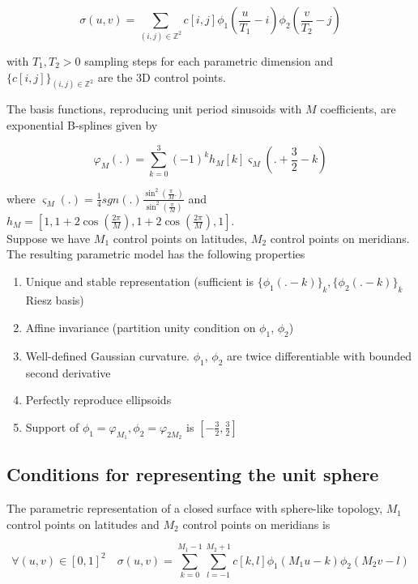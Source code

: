 \documentclass[a4paper, 11pt]{article}
\begin{document}
\begin{equation}
  \sigma(u, v) = \sum_{(i,j) \in \mathbb{Z}^2} c[i,j] \phi_1(\frac{u}{T_1}-i) \phi_2(\frac{v}{T_2}-j)
\end{equation}

with $T_1, T_2 > 0$ sampling steps for each parametric dimension and ${\{c[i,j]\}}_{(i,j) \in \mathbb{Z}^2}$ are the 3D 
control points.

The basis functions, reproducing unit period sinusoids with $M$ coefficients, are exponential B-splines given by

\begin{equation}
  \varphi_{M}(.) = \sum_{k=0}^3 {(-1)}^k h_{M}[k] \varsigma_M(. + \frac{3}{2} - k)
\end{equation}
  
where $\displaystyle \varsigma_M(.) = \frac{1}{4} sgn(.) \frac{\sin^2(\frac{\pi}{M}.)}{\sin^2(\frac{\pi}{M})}$ and $h_M 
= [1, 1+2\cos(\frac{2\pi}{M}), 1+2\cos(\frac{2\pi}{M}), 1]$. \\ 

Suppose we have $M_1$ control points on latitudes, $M_2$ control points on meridians. The resulting parametric model has 
the following properties
\begin{enumerate}
  \item Unique and stable representation (sufficient is ${\{\phi_1(.-k)\}}_{k}, {\{\phi_2(.-k)\}}_{k}$ Riesz basis)
  \item Affine invariance (partition unity condition on  $\phi_1$, $\phi_2$)
  \item Well-defined Gaussian curvature. $\phi_1$, $\phi_2$ are twice differentiable with bounded second derivative
  \item Perfectly reproduce ellipsoids
  \item Support of $\phi_1=\varphi_{M_1}, \phi_2=\varphi_{2M_2}$ is $[-\frac{3}{2}, \frac{3}{2}]$
\end{enumerate}

\subsection{Conditions for representing the unit sphere}

The parametric representation of a closed surface with sphere-like topology, $M_1$ control points on latitudes and $M_2$ 
control points on meridians is

\begin{equation}
  \forall (u, v) \in {[0,1]}^2 \quad \sigma(u,v) = \sum_{k=0}^{M_1-1} \sum_{l=-1}^{M_2+1} c[k,l] \phi_{1} 
  (M_1u-k)\phi_2(M_2v-l)
\end{equation}
\end{document}
